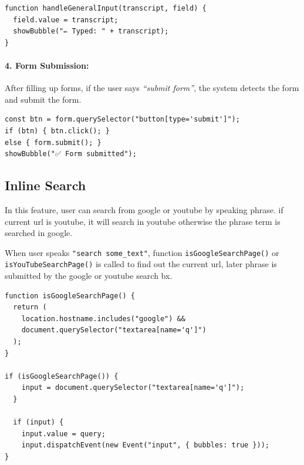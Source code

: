 \begin{verbatim}
function handleGeneralInput(transcript, field) {
  field.value = transcript;
  showBubble("✏️ Typed: " + transcript);
}
\end{verbatim}

\paragraph{4. Form Submission:}
After filling up forms, if the user says \textit{``submit form''}, the system detects the form and submit the form.

\begin{verbatim}
const btn = form.querySelector("button[type='submit']");
if (btn) { btn.click(); }
else { form.submit(); }
showBubble("✅ Form submitted");
\end{verbatim}

\subsection{Inline Search}
In this feature, user can search from google or youtube by speaking phrase. if current url is youtube, it will search in youtube otherwise the phrase term is searched in google.

When user speaks \texttt{"search some_text"}, function \texttt{isGoogleSearchPage()} or \texttt{isYouTubeSearchPage()} is called to find out the current url, later phrase is submitted by the google or youtube search bx.

\begin{verbatim}
function isGoogleSearchPage() {
  return (
    location.hostname.includes("google") &&
    document.querySelector("textarea[name='q']")
  );
}

if (isGoogleSearchPage()) {
    input = document.querySelector("textarea[name='q']");
  }

  if (input) {
    input.value = query;
    input.dispatchEvent(new Event("input", { bubbles: true }));
}
\end{verbatim}

